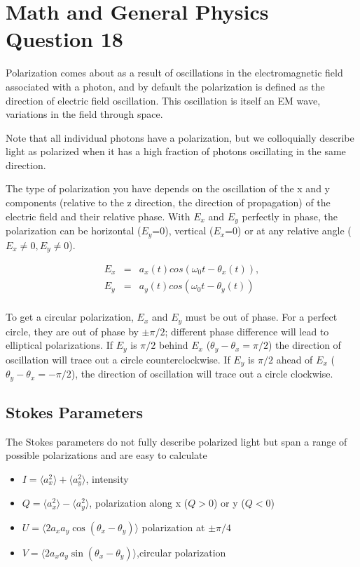 \documentclass[a4paper,11pt]{scrartcl}
\begin{document}
\section*{Math and General Physics Question 18}

Polarization comes about as a result of oscillations in the electromagnetic field associated with a photon, and by default the polarization is defined as the direction of electric field oscillation. This oscillation is itself an EM wave, variations in the field through space.

Note that all individual photons have a polarization, but we colloquially describe light as polarized when it has a high fraction of photons oscillating in the same direction.

The type of polarization you have depends on the oscillation of the x and y components (relative to the z direction, the direction of propagation) of the electric field and their relative phase. With $E_x$ and $E_y$ perfectly in phase, the polarization can be horizontal ($E_y$=0), vertical ($E_x$=0) or at any relative angle ($E_x\neq0,E_y\neq0$).

\begin{eqnarray}
E_x &=& a_x(t)cos(\omega_0t-\theta_x(t)),\\
E_y &=& a_y(t)cos(\omega_0t-\theta_y(t))\\
\end{eqnarray}

To get a circular polarization, $E_x$ and $E_y$ must be out of phase. For a perfect circle, they are out of phase by $\pm\pi/2$; different phase difference will lead to elliptical polarizations. If $E_y$ is $\pi/2$ behind $E_x$ ($\theta_y-\theta_x = \pi/2$) the direction of oscillation will trace out a circle counterclockwise. If $E_y$ is $\pi/2$ ahead of $E_x$ ($\theta_y-\theta_x = -\pi/2$), the direction of oscillation will trace out a circle clockwise.

\subsection{Stokes Parameters}

The Stokes parameters do not fully describe polarized light but span a range of possible polarizations and are easy to calculate

\begin{itemize}
    \item $I = \langle a_x^2\rangle + \langle a_y^2 \rangle$, intensity
    \item $Q = \langle a_x^2\rangle - \langle a_y^2 \rangle$, polarization along x ($Q>0$) or y ($Q < 0$)
    \item $U = \langle 2a_x a_y \cos(\theta_x-\theta_y)\rangle$ polarization at $\pm \pi/4$
    \item $V = \langle 2a_x a_y \sin(\theta_x-\theta_y)\rangle$,circular polarization
\end{itemize}
\end{document}
